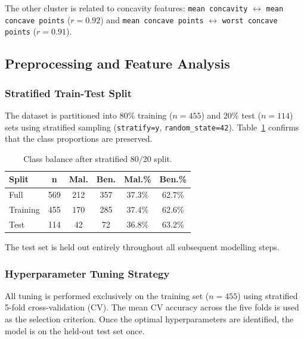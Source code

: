\documentclass[twocolumn, fontsize=10pt]{article}
\begin{document}
The other cluster is related to concavity features: \texttt{mean concavity} $\leftrightarrow$ \texttt{mean concave points} ($r = 0.92$) and \texttt{mean concave points} $\leftrightarrow$ \texttt{worst concave points} ($r = 0.91$).



\subsection{Preprocessing and Feature Analysis}

\subsubsection{Stratified Train-Test Split}

The dataset is partitioned into 80\% training ($n = 455$) and 20\% test ($n = 114$) sets using stratified sampling (\texttt{stratify=y}, \texttt{random\_state=42}). Table~\ref{tab:split_balance} confirms that the class proportions are preserved.

\begin{table}[H]
\centering
\small
\setlength{\tabcolsep}{4pt}
\begin{tabular}{lccccc}
\toprule
\textbf{Split} & \textbf{n} & \textbf{Mal.} & \textbf{Ben.} & \textbf{Mal.\%} & \textbf{Ben.\%} \\
\midrule
Full       & 569 & 212 & 357 & 37.3\% & 62.7\% \\
Training   & 455 & 170 & 285 & 37.4\% & 62.6\% \\
Test       & 114 &  42 &  72 & 36.8\% & 63.2\% \\
\bottomrule
\end{tabular}
\caption{Class balance after stratified 80/20 split.}
\label{tab:split_balance}
\end{table}

The test set is held out entirely throughout all subsequent modelling steps.

\subsubsection{Hyperparameter Tuning Strategy}

All tuning is performed exclusively on the training set ($n = 455$) using stratified 5-fold cross-validation (CV). The mean CV accuracy across the five folds is used as the selection criterion. Once the optimal hyperparameters are identified, the model is on the held-out test set once.
\end{document}

